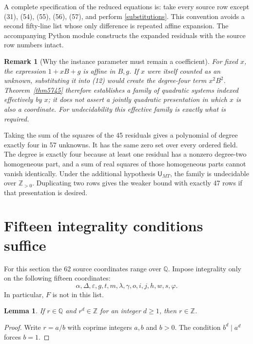 \documentclass[11pt]{article}
\newtheorem{lemma}[theorem]{Lemma}
\newtheorem{remark}[theorem]{Remark}
\newcommand{\Z}{\mathbb Z}
\newcommand{\Q}{\mathbb Q}
\newcommand{\Np}{\mathbb Z_{>0}}
\begin{document}
A complete specification of the reduced equations is: take every source
row except (31), (54), (55), (56), (57), and perform
\eqref{substitutions}. This convention avoids a second fifty-line list
whose only difference is repeated affine expansion. The accompanying
Python module constructs the expanded residuals with the source row
numbers intact.

\begin{remark}[Why the instance parameter must remain a coefficient]
For fixed \(x\), the expression \(1+xB+g\) is affine in \(B,g\).
If \(x\) were itself counted as an unknown, substituting it into (12)
would create the degree-four term \(x^2B^2\). Theorem~\ref{thm5745}
therefore establishes a family of quadratic systems indexed effectively
by \(x\); it does not assert a jointly quadratic presentation in which
\(x\) is also a coordinate. For undecidability this effective family is
exactly what is required.
\end{remark}

Taking the sum of the squares of the 45 residuals gives a polynomial of
degree exactly four in 57 unknowns. It has the same zero set over every
ordered field. The degree is exactly four because at least one residual
has a nonzero degree-two homogeneous part, and a sum of real squares of
those homogeneous parts cannot vanish identically. Under the additional hypothesis \(\mathsf U_{MT}\), the family is undecidable over \(\Np\).
Duplicating two rows gives the weaker bound with exactly 47 rows if that
presentation is desired.

\section{Fifteen integrality conditions suffice}
For this section the 62 source coordinates range over \(\Q\). Impose
integrality only on the following fifteen coordinates:
\begin{equation}\label{fifteen}
\alpha,\Delta,\varepsilon,g,t,m,\lambda,\gamma,o,i,j,h,w,s,\varphi.
\end{equation}
In particular, \(F\) is not in this list.

\begin{lemma}\label{monic}
If \(r\in\Q\) and \(r^d\in\Z\) for an integer \(d\ge1\), then
\(r\in\Z\).
\end{lemma}
\begin{proof}
Write \(r=a/b\) with coprime integers \(a,b\) and \(b>0\).
The condition \(b^d\mid a^d\) forces \(b=1\).
\end{proof}
\end{document}
